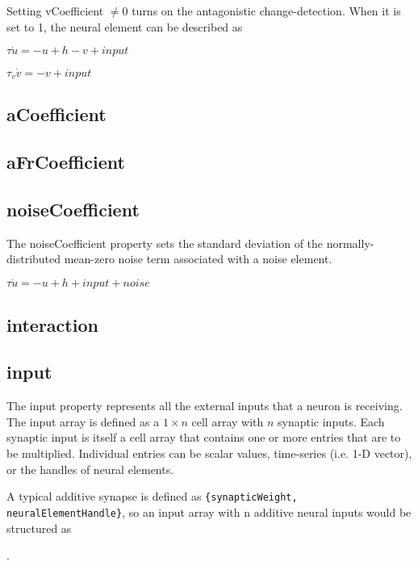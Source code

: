 \documentclass[phd, 12pt, doublespace, online]{fauthesis}
\begin{document}
Setting vCoefficient $\neq 0$ turns on the antagonistic change-detection. When it is set to 1, the neural element can be described as 

\bigskip
\noindent $ \tau \dot{u} = -u + h - v + input $

\noindent $ \tau_v \dot{v} = -v + input $


\subsection{aCoefficient}
\subsection{aFrCoefficient}
\subsection{noiseCoefficient}

The noiseCoefficient property sets the standard deviation of the normally-distributed mean-zero noise term associated with a noise element. 

\noindent $ \tau \dot{u} = -u + h + input + noise$

\subsection{interaction}
\subsection{input}

The input property represents all the external inputs that a neuron is receiving. The input array is defined as a $1 \times n$ cell array with $n$ synaptic inputs. Each synaptic input is itself a cell array that contains one or more entries that are to be multiplied. Individual entries can be scalar values, time-series (i.e. 1-D vector), or the handles of neural elements. 

A typical additive synapse is defined as {\tt \{synapticWeight, neuralElementHandle\}}, so an input array with n additive neural inputs would be structured as

. 
\end{document}
